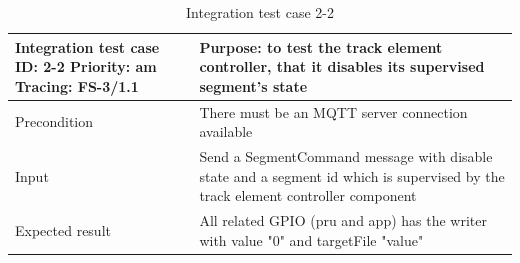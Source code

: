 \begin{table}[H]
	\caption{Integration test case 2-2}
	\label{table:TCase-FSI2-2}
	\begin{center}
		\renewcommand{\arraystretch}{1.8}
		\begin{tabu} 
			to 0.9 \textwidth
			{  X[0.4, c] X[c] }
			\toprule
			Integration test case ID: 2-2 \newline Priority: am \newline Tracing: FS-3/1.1 & Purpose: to test the track element controller, that it disables its supervised segment's state                                  \\ \midrule
			Precondition                                                                   & There must be an MQTT server connection available                                                                               \\
			Input                                                                          & Send a SegmentCommand message with disable state and a segment id which is supervised by the track element controller component \\
			Expected result                                                                & All related GPIO (pru and app) has the writer with value "0" and targetFile "value"                                             \\ \bottomrule
		\end{tabu}
	\end{center}
\end{table} 

